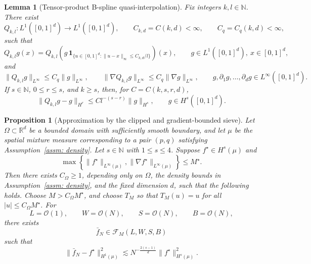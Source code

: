 \documentclass[10pt,a4paper]{amsart}
\newtheorem{lemma}{Lemma}
\newtheorem{proposition}{Proposition}
\begin{document}
\begin{lemma}[Tensor-product B-spline quasi-interpolation]
\label{lem:spline-stability}
Fix integers \(k,l\in\mathbb N\). There exist
\[
Q_{k,l}:L^1([0,1]^d)\to L^1([0,1]^d),
\qquad
C_{k,d}=C(k,d)<\infty,
\qquad
C_q=C_q(k,d)<\infty,
\]
such that
\[
Q_{k,l}g(x)
=
Q_{k,l}\!\left(
g\,\mathbf 1_{\{u\in[0,1]^d:\|u-x\|_\infty\le C_{k,d}/l\}}
\right)(x),
\qquad
g\in L^1([0,1]^d),\ x\in[0,1]^d,
\]
and
\begin{equation}
\label{eq:qi-Linfty-gradient-stability}
\|Q_{k,l}g\|_{L^\infty}
\le
C_q\|g\|_{L^\infty},
\qquad
\|\nabla Q_{k,l}g\|_{L^\infty}
\le
C_q\|\nabla g\|_{L^\infty},
\qquad
g,\partial_1g,\ldots,\partial_dg\in L^\infty([0,1]^d).
\end{equation}
If \(s\in\mathbb N\), \(0\le r\le s\), and \(k\ge s\), then, for
\(C=C(k,s,r,d)\),
\begin{equation}
\label{eq:bspline-Hr-approx-general}
\|Q_{k,l}g-g\|_{H^r}
\le
C l^{-(s-r)}
\|g\|_{H^s},
\qquad
g\in H^s([0,1]^d).
\end{equation}
\end{lemma}

\begin{proposition}[Approximation by the clipped and gradient-bounded sieve]
\label{prop: approximate of clipped NN}
Let \(\Omega\subset\mathbb R^d\) be a bounded domain with sufficiently smooth
boundary, and let \(\mu\) be the spatial mixture measure corresponding to a pair
\((p,q)\) satisfying Assumption~\ref{assm: density}. Let \(s\in\mathbb N\)
with \(1\le s\le4\). Suppose
$
f^\star\in H^s(\mu)
$
and
\[
\max\left\{
\|f^\star\|_{L^\infty(\mu)},
\|\nabla f^\star\|_{L^\infty(\mu)}
\right\}
\le M^\star .
\]
Then there exists \(C_\Omega\ge1\), depending only on \(\Omega\), the density
bounds in Assumption~\ref{assm: density}, and the fixed dimension \(d\), such
that the following holds. Choose \(M>C_\Omega M^\star\), and choose \(T_M\)
so that \(T_M(u)=u\) for all \(|u|\le C_\Omega M^\star\). For
\[
L=\mathcal O(1),
\qquad
W=\mathcal O(N),
\qquad
S=\mathcal O(N),
\qquad
B=\mathcal O(N),
\]
there exists
\[
\bar f_N\in\mathcal F_M(L,W,S,B)
\]
such that
\begin{equation}
\label{eq:clipped-approx-H1-final}
\|\bar f_N-f^\star\|_{H^1(\mu)}^2
\lesssim
N^{-\frac{2(s-1)}{d}}
\|f^\star\|_{H^s(\mu)}^2 .
\end{equation}
\end{proposition}
\end{document}
